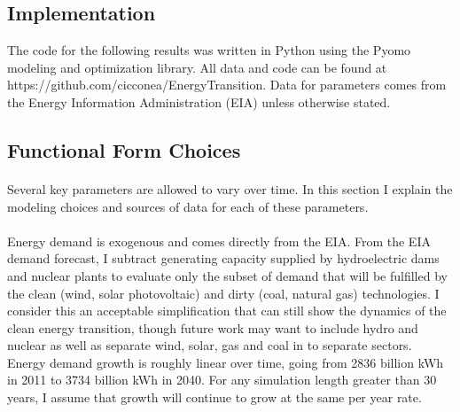 \documentclass[singlespace]{easychithesis}
\begin{document}
\subsection{Implementation}
The code for the following results was written in Python using the Pyomo modeling and optimization library. All data and code can be found at \\ https://github.com/cicconea/EnergyTransition. Data for parameters comes from the Energy Information Administration (EIA) unless otherwise stated.  

\subsection{Functional Form Choices}

\paragraph{} Several key parameters are allowed to vary over time. In this section I explain the modeling choices and sources of data for each of these parameters. 

\paragraph{} Energy demand is exogenous and comes directly from the EIA. From the EIA demand forecast, I subtract generating capacity supplied by hydroelectric dams and nuclear plants to evaluate only the subset of demand that will be fulfilled by the clean (wind, solar photovoltaic) and dirty (coal, natural gas) technologies. I consider this an acceptable simplification that can still show the dynamics of the clean energy transition, though future work may want to include hydro and nuclear as well as separate wind, solar, gas and coal in to separate sectors. Energy demand growth is roughly linear over time, going from 2836 billion kWh in 2011 to 3734 billion kWh in 2040. For any simulation length greater than 30 years, I assume that growth will continue to grow at the same per year rate. 
\end{document}
